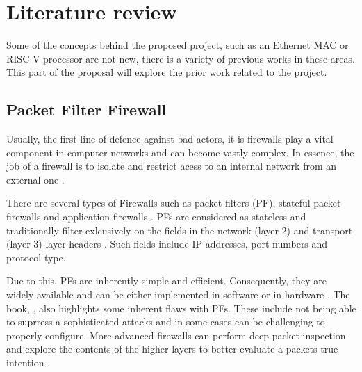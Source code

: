 
\chapter[Literature review]{Literature review }
\label{Chap:label}	%
\pagestyle{headings}



Some of the concepts behind the proposed project, such as an Ethernet MAC or RISC-V processor are not new, there is a variety of previous works in these areas. This part of the proposal will explore the prior work related to the project. 




\section{Packet Filter Firewall}

Usually, the first line of defence against bad actors, it is firewalls play a vital component in computer networks and can become vastly complex. 
In essence, the job of a firewall is to isolate and restrict acess to an internal network from an external one \cite{BuildingInternetFirewalls}.

There are several types of Firewalls such as packet filters (PF), stateful packet firewalls and application firewalls \cite{FirewallsBook}. 
PFs are considered as stateless and traditionally filter exlcusively on the fields in the network (layer 2) and transport 
(layer 3) layer headers \cite{FirewallsBook}. Such fields include IP addresses, port numbers and protocol type.

Due to this, PFs are inherently simple and efficient. Consequently, they are widely available and can be either implemented in software or in 
hardware \cite{BuildingInternetFirewalls}. The book, \cite{BuildingInternetFirewalls}, also highlights some inherent flaws with PFs. These include not being able 
to suprress a sophisticated attacks and in some cases can be challenging to properly configure. More advanced firewalls can perform deep packet inspection and 
explore the contents of the higher layers to better evaluate a packets true intention \cite{FirewallsBook}. 




